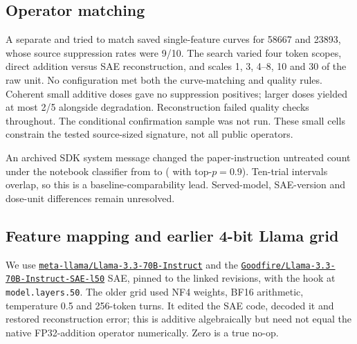 \documentclass[11pt]{article}
\begin{document}
\subsection{Operator matching}
\label{sec:operator-matching}
A separate
and
tried to match saved single-feature curves for 58667 and 23893, whose
source suppression rates were 9/10. The search varied four token scopes,
direct addition versus SAE reconstruction, and scales 1, 3, 4--8, 10 and
30 of the raw unit. No configuration met both the curve-matching and
quality rules. Coherent small additive doses gave no suppression positives;
larger doses yielded at most 2/5 alongside degradation. Reconstruction
failed quality checks throughout. The conditional confirmation sample was
not run. These small cells constrain the tested source-sized signature,
not all public operators.

An archived SDK system message changed the paper-instruction untreated
count under the notebook classifier from \CEBridgeNoSystem{} to
\CEBridgeSDKFull{} (\CEBridgeSDKNucleus{} with top-$p=0.9$).
Ten-trial intervals overlap, so this is a baseline-comparability lead.
Served-model, SAE-version and dose-unit differences remain unresolved.

\subsection{Feature mapping and earlier 4-bit Llama grid}
\label{app:implementation}
We use
\href{https://huggingface.co/meta-llama/Llama-3.3-70B-Instruct/tree/6f6073b423013f6a7d4d9f39144961bfbfbc386b}{\texttt{meta-llama/Llama-3.3-70B-Instruct}}\newline
and the
\href{https://huggingface.co/Goodfire/Llama-3.3-70B-Instruct-SAE-l50/tree/128ee921ecd1b8b3a87d776cbcc357c0855da134}{\texttt{Goodfire/Llama-3.3-70B-Instruct-SAE-l50}}
SAE, pinned to the linked revisions, with the hook at
\texttt{model.layers.50}. The older grid used NF4 weights, BF16 arithmetic,
temperature 0.5 and 256-token turns. It edited the SAE code, decoded it and
restored reconstruction error; this is additive algebraically but need not
equal the native FP32-addition operator numerically. Zero is a true no-op.
\end{document}
